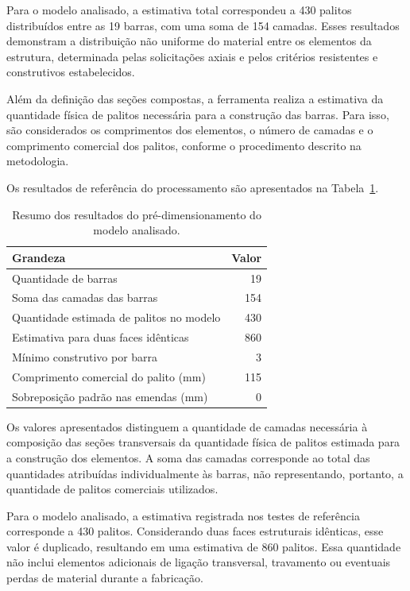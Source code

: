 Para o modelo analisado, a estimativa total correspondeu a 430 palitos distribuídos entre as 19 barras, com uma soma de 154 camadas. Esses resultados demonstram a distribuição não uniforme do material entre os elementos da estrutura, determinada pelas solicitações axiais e pelos critérios resistentes e construtivos estabelecidos.

Além da definição das seções compostas, a ferramenta realiza a estimativa da quantidade física de palitos necessária para a construção das barras. Para isso, são considerados os comprimentos dos elementos, o número de camadas e o comprimento comercial dos palitos, conforme o procedimento descrito na metodologia.

Os resultados de referência do processamento são apresentados na Tabela~\ref{tab:resultado-palitos}.

\begin{table}[H]
    \centering
    \caption{Resumo dos resultados do pré-dimensionamento
    do modelo analisado.}
    \label{tab:resultado-palitos}
    \begin{tabular}{lr}
        \hline
        \textbf{Grandeza} & \textbf{Valor} \\
        \hline
        Quantidade de barras & 19 \\
        Soma das camadas das barras & 154 \\
        Quantidade estimada de palitos no modelo & 430 \\
        Estimativa para duas faces idênticas & 860 \\
        Mínimo construtivo por barra & 3 \\
        Comprimento comercial do palito (mm) & 115 \\
        Sobreposição padrão nas emendas (mm) & 0 \\
        \hline
    \end{tabular}
\end{table}

Os valores apresentados distinguem a quantidade de camadas necessária à composição das seções transversais da quantidade física de palitos estimada para a construção dos elementos. A soma das camadas corresponde ao total das quantidades atribuídas individualmente às barras, não representando, portanto, a quantidade de palitos comerciais utilizados.

Para o modelo analisado, a estimativa registrada nos testes de referência corresponde a 430 palitos. Considerando duas faces estruturais idênticas, esse valor é duplicado, resultando em uma estimativa de 860 palitos. Essa quantidade não inclui elementos adicionais de ligação transversal, travamento ou eventuais perdas de material durante a fabricação.

